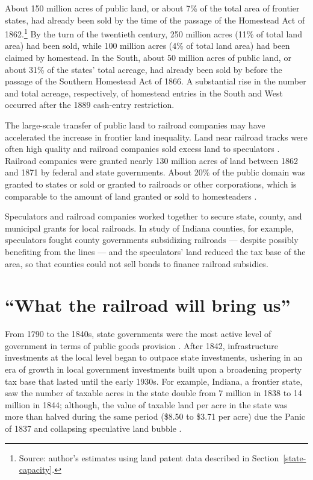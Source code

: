 About 150 million acres of public land, or about 7\% of the total area of frontier states, had already been sold by the time of the passage of the Homestead Act of 1862.\footnote{Source: author's estimates using land patent data described in Section~\ref{state-capacity}.} By the turn of the twentieth century, 250 million acres (11\% of total land area) had been sold, while 100 million acres (4\% of total land area) had been claimed by homestead. In the South, about 50 million acres of public land, or about 31\% of the states' total acreage, had already been sold by before the passage of the Southern Homestead Act of 1866. A substantial rise in the number and total acreage, respectively, of homestead entries in the South and West occurred after the 1889 cash-entry restriction.

The large-scale transfer of public land to railroad companies may have accelerated the increase in frontier land inequality. Land near railroad tracks were often high quality and railroad companies sold excess land to speculators \citep{murtazashvili2013political}. Railroad companies were granted nearly 130 million acres of land between 1862 and 1871 by federal and state governments. About 20\% of the public domain was granted to states or sold or granted to railroads or other corporations, which is comparable to the amount of land granted or sold to homesteaders \citep{shanks2005homestead}.

Speculators and railroad companies worked together to secure state, county, and municipal grants for local railroads. In  study of Indiana counties, for example, speculators fought county governments subsidizing railroads --- despite possibly benefiting from the lines --- and the speculators' land reduced the tax base of the area, so that counties could not sell bonds to finance railroad subsidies. 

\section{``What the railroad will bring us''} 

From 1790 to the 1840s, state governments were the most active level of government in terms of public goods provision \citep{wallis2000american}. After 1842, infrastructure investments at the local level began to outpace state investments, ushering in an era of growth in local government investments built upon a broadening property tax base that lasted until the early 1930s. For example, Indiana, a frontier state, saw the number of taxable acres in the state double from 7 million in 1838 to 14 million in 1844; although, the value of taxable land per acre in the state was more than halved during the same period (\$8.50 to \$3.71 per acre) due the Panic of 1837 and collapsing speculative land bubble \citep{wallis2004sovereign}. 

